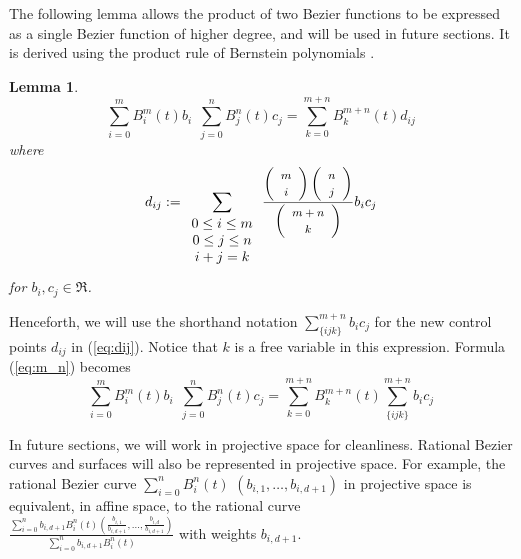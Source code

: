 \documentclass[times]{article}
\newcommand{\QED}{\vrule height 1.4ex width 1.0ex depth -.1ex\ } %
\newcommand{\prf}{\noindent{{\bf Proof} :\ }}
\newcommand{\choice}[2]{\left( \begin{array}{c} \mbox{\footnotesize{$#1$}} \\ \mbox{\footnotesize{$#2$}} \end{array} \right)}
\newtheorem{lemma}{Lemma}[section]
\begin{document}
The following lemma allows the product of two Bezier functions to be
expressed as a single Bezier function of higher degree, and will be
used in future sections.
It is derived using the product rule of Bernstein polynomials \cite{farin93}.

\begin{lemma}
\label{lem:product}
\begin{equation}
\label{eq:m_n}
\sum_{i=0}^{m} B_i^m(t) b_i \ \ \sum_{j=0}^{n} B_j^n(t) c_j
= \sum_{k=0}^{m+n} B_k^{m+n}(t) d_{ij}
\end{equation}
where
\begin{equation}
\label{eq:dij}
d_{ij} := \sum_{\begin{array}{c} 0 \leq i \leq m \\ 
			     0 \leq j \leq n \\ 
			     i+j=k
			     \end{array}}
	\frac{\choice{m}{i} \choice{n}{j}}{\choice{m+n}{k}}  b_i c_j
\end{equation}
for $b_i,c_j \in \Re$.
\end{lemma}

Henceforth, we will use the shorthand notation 
$\sum_{\{ijk\}}^{m+n} b_i c_j$ for the new control points $d_{ij}$
in (\ref{eq:dij}).
Notice that $k$ is a free variable in this expression.
Formula (\ref{eq:m_n}) becomes
\begin{equation}
\label{eq:shorthand}
\sum_{i=0}^{m} B_i^m(t) b_i \ \ \sum_{j=0}^{n} B_j^n(t) c_j
= \sum_{k=0}^{m+n} B_k^{m+n}(t) \sum_{\{ijk\}}^{m+n} b_i c_j
\end{equation}

In future sections,
we will work in projective space for cleanliness.
Rational Bezier curves and surfaces will also be represented in projective
space.
For example, the rational Bezier curve 
$\sum_{i=0}^{n} B_i^n(t)$ $(b_{i,1},\ldots,b_{i,d+1})$ in projective space is
equivalent, in affine space, to the rational curve \\
$\frac{\sum_{i=0}^{n} b_{i,d+1} B_i^n(t) 
	(\frac{b_{i,1}}{b_{i,d+1}},\ldots,\frac{b_{i,d}}{b_{i,d+1}})}
      {\sum_{i=0}^{n} b_{i,d+1} B_i^n(t)}$
with weights $b_{i,d+1}$.
\end{document}
